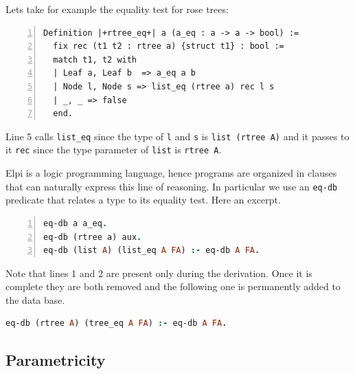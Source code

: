 \documentclass[sigplan,10pt,review]{acmart}\settopmatter{printfolios=true,printccs=false,printacmref=false}
\begin{document}
Lets take for example the equality test for rose trees:

\begin{lstlisting}[numbers=left]
Definition |+rtree_eq+| a (a_eq : a -> a -> bool) :=
  fix rec (t1 t2 : rtree a) {struct t1} : bool :=
  match t1, t2 with
  | Leaf a, Leaf b  => a_eq a b
  | Node l, Node s => list_eq (rtree a) rec l s
  | _, _ => false
  end.
\end{lstlisting}

\noindent
Line 5 calls \lstinline+list_eq+ since the type of \lstinline+l+ and
\lstinline+s+ is \lstinline+list (rtree A)+ and it passes to it
\lstinline+rec+ since the type parameter of \lstinline+list+ is
\lstinline+rtree A+.

Elpi is a logic programming language, hence programs are organized in
clauses that can naturally express this line of reasoning. In
particular we use an \lstinline+eq-db+ predicate that relates
a type to its equality test. Here an excerpt.

\begin{lstlisting}[language=Prolog, numbers=left]
eq-db a a_eq.
eq-db (rtree a) aux.
eq-db (list A) (list_eq A FA) :- eq-db A FA.
\end{lstlisting}

\noindent
Note that lines 1 and 2 are present only during the derivation. Once it
is complete they are both removed and the following one is permanently
added to the data base.

\begin{lstlisting}[language=Prolog]
eq-db (rtree A) (tree_eq A FA) :- eq-db A FA.
\end{lstlisting}

% 
% 

\subsection{Parametricity} %
\end{document}
